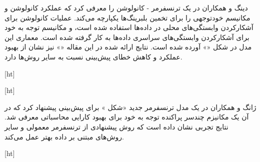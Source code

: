 دینگ و همکاران در  یک ترنسفرمر - کانولوشن را معرفی کرد که عملکرد کانولوشن و مکانیسم خودتوجهی را برای تخمین  بلبرینگ‌ها یکپارچه می‌کند. عملیات کانولوشن برای آشکارکردن وابستگی‌های محلی در داده‌ها استفاده شده است، و مکانیسم توجه به خود برای آشکارکردن وابستگی‌های سراسری داده‌ها به کار گرفته شده است. معماری این مدل در شکل «» آورده شده است. نتایج ارائه شده در این مقاله «» نیز نشان از بهبود عملکرد و کاهش خطای پیش‌بینی نسبت به سایر روش‌ها دارد.




[ht]



[ht]




ژانگ و همکاران در  یک مدل ترنسفرمر جدید «شکل » برای پیش‌بینی  پیشنهاد کرد که در آن یک مکانیزم چندسر پراکنده توجه به خود برای بهبود کارایی محاسباتی معرفی شد. نتایج تجربی نشان داده است که روش پیشنهادی از ترنسفرمر معمولی و سایر روش‌های مبتنی بر داده بهتر عمل می‌کند.


[ht]
